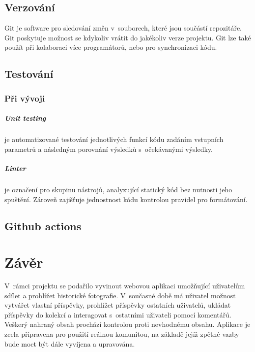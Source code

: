 \documentclass[12pt, a4paper,
  oneside,      %
]{report}
\begin{document}
\section{Verzování}
Git je software pro sledování změn v~souborech, které jsou součástí repozitáře. Git poskytuje možnost se kdykoliv vrátit do jakékoliv verze projektu. Git lze také použít při kolaboraci více programátorů, nebo pro synchronizaci kódu.
\section{Testování}
\subsection{Při vývoji}
\paragraph{Unit testing} je automatizované testování jednotlivých funkcí kódu zadáním vstupních parametrů a následným porovnání výsledků s~očekávanými výsledky.
\paragraph{Linter} je označení pro skupinu nástrojů, analyzující statický kód bez nutnosti jeho spuštění. Zároveň zajišťuje jednostnost kódu kontrolou pravidel pro formátování.
\section{Github actions}

\chapter{Závěr}
V~rámci projektu se podařilo vyvinout webovou aplikaci umožňující uživatelům sdílet a prohlížet historické fotografie. V~současné době má uživatel možnost vytvářet vlastní příspěvky, prohlížet příspěvky ostatních uživatelů, ukládat příspěvky do kolekcí a interagovat s~ostatními uživateli pomocí komentářů. Veškerý nahraný obsah prochází kontrolou proti nevhodnému obsahu. Aplikace je zcela připravena pro použití reálnou komunitou, na základě jejíž zpětné vazby bude moct být dále vyvíjena a upravována.

\listoffigures


\end{document}
